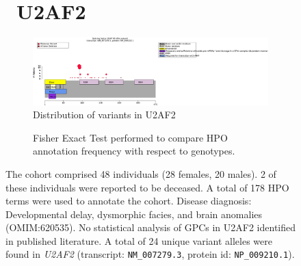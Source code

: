 \begin{figure}[htbp]
\section*{ U2AF2}
\centering
\begin{subfigure}[b]{0.95\textwidth}
\centering
\includegraphics[width=\textwidth]{ img/U2AF2_protein_diagram.pdf} 
\captionsetup{justification=raggedright,singlelinecheck=false}
\caption{Distribution of variants in U2AF2}
\end{subfigure}

\vspace{2em}

\begin{subfigure}[b]{0.95\textwidth}
\centering
{}
\captionsetup{justification=raggedright,singlelinecheck=false}
\caption{Fisher Exact Test performed to compare HPO annotation frequency with respect to genotypes. }
\end{subfigure}

\vspace{2em}

\caption{ The cohort comprised 48 individuals (28 females, 20 males). 2 of these individuals were reported to be deceased. A total of 178 HPO terms were used to annotate the cohort. Disease diagnosis: Developmental delay, dysmorphic facies, and brain anomalies (OMIM:620535). No statistical analysis of GPCs in U2AF2 identified in published literature. A total of 24 unique variant alleles were found in \textit{U2AF2} (transcript: \texttt{NM\_007279.3}, protein id: \texttt{NP\_009210.1}).}
\end{figure}
